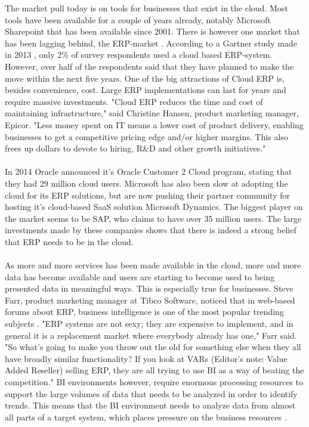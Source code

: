 \documentclass{cslthse-msc}
\begin{document}
The market pull today is on tools for businesses that exist in the cloud. Most tools have been available for a couple of years already, notably Microsoft Sharepoint that has been available since 2001. There is however one market that has been lagging behind, the ERP-market \cite{wilson}. According to a Gartner study made in 2013 \cite{Rayner13}, only 2\% of survey respondents used a cloud based ERP-system. However, over half of the respondents said that they have planned to make the move within the next five years. One of the big attractions of Cloud ERP is, besides convenience, cost. Large ERP implementations can last for years and require massive investments. "Cloud ERP reduces the time and cost of maintaining infrastructure," said Christine Hansen, product marketing manager, Epicor. "Less money spent on IT means a lower cost of product delivery, enabling businesses to get a competitive pricing edge and/or higher margins. This also frees up dollars to devote to hiring, R\&D and other growth initiatives." \cite{Robb14} \\\\
In 2014 Oracle announced it's Oracle Customer 2 Cloud program, stating that they had 29 million cloud users. Microsoft has also been slow at adopting the cloud for its ERP solutions, but are now pushing their partner community for hosting it's cloud-based SaaS solution Microsoft Dynamics.
The biggest player on the market seems to be SAP, who claims to have over 35 million users. The large investments made by these companies shows that there is indeed a strong belief that ERP needs to be in the cloud.\\\\
As more and more services has been made available in the cloud, more and more data has become available and users are starting to become used to being presented data in meaningful ways. This is especially true for businesses. Steve Farr, product marketing manager at Tibco Software, noticed that in web-based forums about ERP, business intelligence is one of the most popular trending subjects \cite{RobbOkt14}. "ERP systems are not sexy; they are expensive to implement, and in general it is a replacement market where everybody already has one," Farr said. "So what's going to make you throw out the old for something else when they all have broadly similar functionality? If you look at VARs (Editor's note: Value Added Reseller) selling ERP, they are all trying to use BI as a way of beating the competition." BI environments however, require enormous processing resources to support the large volumes of data that needs to be analyzed in order to identify trends. This means that the BI environment needs to analyze data from almost all parts of a target system, which places pressure on the business resources \cite{Thompson10}.\\\\
\end{document}
